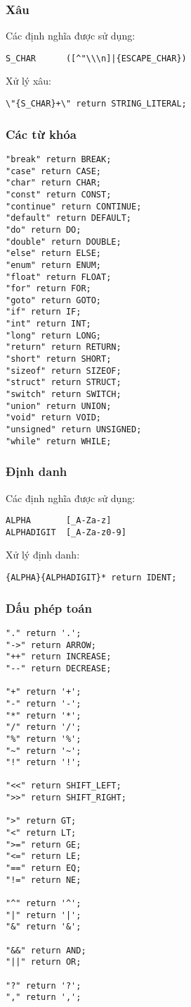 \documentclass[../report.tex]{subfiles}
\begin{document}
\subsubsection{Xâu}
Các định nghĩa được sử dụng: 
\begin{lstlisting}
S_CHAR      ([^"\\\n]|{ESCAPE_CHAR})
\end{lstlisting}
Xử lý xâu:
\begin{lstlisting}
\"{S_CHAR}+\" return STRING_LITERAL;
\end{lstlisting}

\subsubsection{Các từ khóa}
\begin{lstlisting}
"break" return BREAK;
"case" return CASE;
"char" return CHAR;
"const" return CONST;
"continue" return CONTINUE;
"default" return DEFAULT;
"do" return DO;
"double" return DOUBLE;
"else" return ELSE;
"enum" return ENUM;
"float" return FLOAT;
"for" return FOR;
"goto" return GOTO;
"if" return IF;
"int" return INT;
"long" return LONG;
"return" return RETURN;
"short" return SHORT;
"sizeof" return SIZEOF;
"struct" return STRUCT;
"switch" return SWITCH;
"union" return UNION;
"void" return VOID;
"unsigned" return UNSIGNED;
"while" return WHILE;
\end{lstlisting}

\subsubsection{Định danh}
Các định nghĩa được sử dụng: 
\begin{lstlisting}
ALPHA       [_A-Za-z]
ALPHADIGIT  [_A-Za-z0-9]
\end{lstlisting}
Xử lý định danh: 
\begin{lstlisting}
{ALPHA}{ALPHADIGIT}* return IDENT;
\end{lstlisting}

\subsubsection{Dấu phép toán}
\begin{lstlisting}
"." return '.';
"->" return ARROW;
"++" return INCREASE;
"--" return DECREASE;

"+" return '+';
"-" return '-';
"*" return '*';
"/" return '/';
"%" return '%';
"~" return '~';
"!" return '!';

"<<" return SHIFT_LEFT;
">>" return SHIFT_RIGHT;

">" return GT;
"<" return LT;
">=" return GE;
"<=" return LE;
"==" return EQ;
"!=" return NE;

"^" return '^';
"|" return '|';
"&" return '&';

"&&" return AND;
"||" return OR;

"?" return '?';
"," return ',';
\end{lstlisting}
\end{document}
